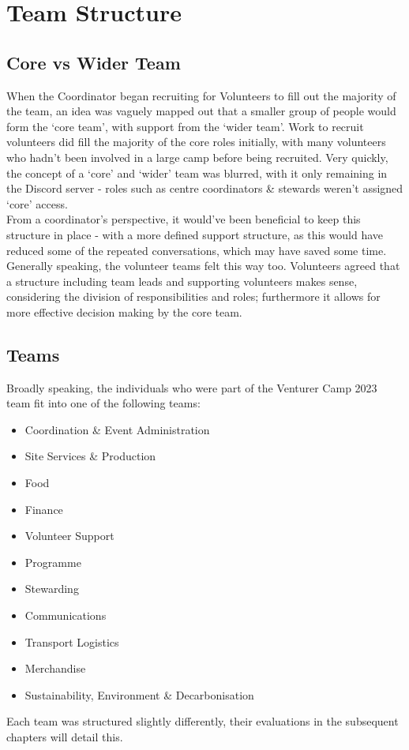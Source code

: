 \chapter{Team Structure}

\section{Core vs Wider Team}
When the Coordinator began recruiting for Volunteers to fill out the majority of the team, an idea was vaguely mapped out that a smaller group of people would form the `core team', with support from the `wider team'. Work to recruit volunteers did fill the majority of the core roles initially, with many volunteers who hadn't been involved in a large camp before being recruited. Very quickly, the concept of a `core' and `wider' team was blurred, with it only remaining in the Discord server - roles such as centre coordinators \& stewards weren't assigned `core' access.\\

From a coordinator's perspective, it would've been beneficial to keep this structure in place - with a more defined support structure, as this would have reduced some of the repeated conversations, which may have saved some time. Generally speaking, the volunteer teams felt this way too. Volunteers agreed that a structure including team leads and supporting volunteers makes sense, considering the division of responsibilities and roles; furthermore it allows for more effective decision making by the core team. 

\section{Teams}
Broadly speaking, the individuals who were part of the Venturer Camp 2023 team fit into one of the following teams:
\begin{itemize}
    \item Coordination \& Event Administration
    \item Site Services \& Production
    \item Food
    \item Finance
    \item Volunteer Support
    \item Programme
    \item Stewarding
    \item Communications
    \item Transport Logistics
    \item Merchandise
    \item Sustainability, Environment \& Decarbonisation
\end{itemize}
Each team was structured slightly differently, their evaluations in the subsequent chapters will detail this. \\


